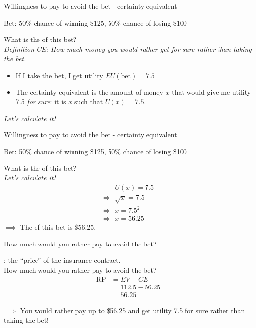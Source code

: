 \begin{frame}{Willingness to pay to avoid the bet - certainty equivalent}

    Bet: 50\% chance of winning \$125, 50\% chance of losing \$100
    \vspace{5mm}

    What is the  of this bet?\\
    \textit{Definition CE: How much money you would rather get for sure rather than taking the bet.}
    \begin{itemize}
        \item If I take the bet, I get utility $EU(\text{bet}) = 7.5$
        \item The certainty equivalent is the amount of money $x$
        that would give me utility 7.5 \textit{for sure}:
        it is $x$ such that $U(x) = 7.5$.
    \end{itemize}
    \pause 
    \vspace{3mm}
    \textit{Let's calculate it!}
\end{frame}
\begin{frame}{Willingness to pay to avoid the bet - certainty equivalent}

    Bet: 50\% chance of winning \$125, 50\% chance of losing \$100
    \vspace{5mm}

    What is the  of this bet?\\
    \vspace{3mm}
    \textit{Let's calculate it!}
    \begin{align*}
        &U(x) = 7.5\\
        \Leftrightarrow &\sqrt{x} = 7.5\\
        \Leftrightarrow &x = 7.5^2\\
        \Leftrightarrow & x = 56.25
    \end{align*}
    $\implies$ The  of this bet is \$56.25.

\end{frame}
\begin{frame}{How much would you rather pay to avoid the bet?}

    : the ``price'' of the insurance contract.\\
    How much would you rather pay to avoid the bet?
    \begin{align*}
        \text{RP} &= EV - CE\\
        &= 112.5 - 56.25\\
        &= 56.25
    \end{align*}

    $\implies$ You would rather pay up to \$56.25 and get utility 7.5 for sure rather than taking the bet!

\end{frame}
